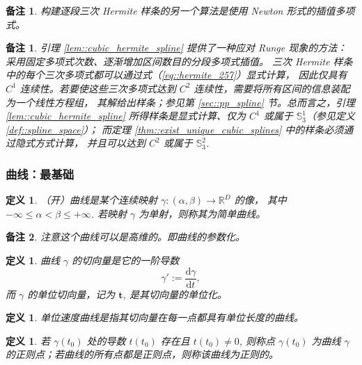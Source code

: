 \documentclass[a4paper]{ctexart}
\newtheorem{remark}{备注}
\newtheorem*{remark*}{备注}
\newtheorem{definition}[theorem]{定义} %
\numberwithin{theorem}{section}
\numberwithin{equation}{section}
\numberwithin{figure}{section}
\numberwithin{remark}{section}
\begin{document}
\begin{remark*}
构建逐段三次 Hermite 样条的另一个算法是使用 Newton 形式的插值多项式。    
\end{remark*}

\begin{remark}
引理 \ref{lem::cubic_hermite_spline} 提供了一种应对 Runge 现象的方法：
采用固定多项式次数、逐渐增加区间数目的分段多项式插值。
三次 Hermite 样条中的每个三次多项式都可以通过式（\ref{eq::hermite_257}）显式计算，
因此仅具有 $C^1$ 连续性。若要使这些三次多项式达到 $C^2$ 连续性，需要将所有区间的信息装配为一个线性方程组，
其解给出样条；参见第 \ref{sec::pp_spline} 节。总而言之，引理 \ref{lem::cubic_hermite_spline} 
所得样条是显式计算、仅为 $C^1$ 或属于 $\mathbb{S}_3^{1}$（参见定义 \ref{def::spline_space}）；
而定理 \ref{thm::exist_unique_cubic_splines} 中的样条必须通过隐式方式计算，
并且可以达到 $C^2$ 或属于 $\mathbb{S}_3^{2}$.
\end{remark}

\subsubsection{曲线：最基础}

\begin{definition}
（开）曲线是某个连续映射 $\gamma:(\alpha,\beta)\to\mathbb{R}^D$ 的像，
其中 $-\infty\le \alpha<\beta\le +\infty$. 若映射 $\gamma$ 为单射，则称其为简单曲线。
\end{definition}

\begin{remark*}
    注意这个曲线可以是高维的。即曲线的参数化。
\end{remark*}

\begin{definition}
曲线 $\gamma$ 的切向量是它的一阶导数
\begin{equation}
\gamma' := \frac{\mathrm{d}\gamma}{\mathrm{d}t},
\end{equation}
而 $\gamma$ 的单位切向量，记为 $\mathbf{t}$, 是其切向量的单位化。
\end{definition}

\begin{definition}
单位速度曲线是指其切向量在每一点都具有单位长度的曲线。
\end{definition}

\begin{definition}
若 $\gamma(t_0)$ 处的导数 $t(t_0)$ 存在且 $t(t_0)\ne 0$, 
则称点 $\gamma(t_0)$ 为曲线 $\gamma$ 的正则点；若曲线的所有点都是正则点，则称该曲线为正则的。
\end{definition}
\end{document}
